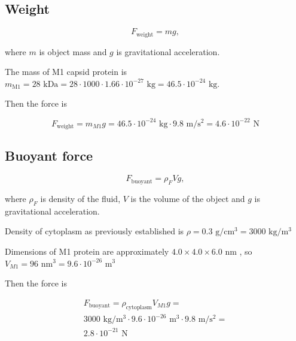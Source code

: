 \subsection{Weight}

\begin{equation}
F_{\text{weight}} = mg,
\end{equation}

where $m$ is object mass and $g$ is gravitational acceleration.

The mass of M1 capsid protein is $m_{\text{M1}} = 28 \text{ kDa} = 28 \cdot 1000 \cdot 1.66 \cdot 10^{-27} \text{ kg} = 46.5 \cdot 10^{-24} \text{ kg}$. \cite{shtykova2013structural}

Then the force is

\begin{equation}
F_{\text{weight}} = m_{M1}g = 46.5 \cdot 10^{-24} \text{ kg} \cdot 9.8 \text{ m}/\text{s}^2 = 4.6 \cdot 10^{-22} \text{ N}
\end{equation}

\subsection{Buoyant force}

\begin{equation}
F_{\text{buoyant}} = \rho_FVg,
\end{equation}

where $\rho_F$ is density of the fluid, $V$ is the volume of the object and $g$ is gravitational acceleration.

Density of cytoplasm as previously established is $\rho = 0.3 \text{ g}/\text{cm}^3 = 3000 \text{ kg}/\text{m}^3$ \cite{hartmann1967cytoplasmic}

Dimensions of M1 protein are approximately $4.0 \times 4.0 \times 6.0 \text{ nm}$ \cite{shtykova2013structural}, so $V_{M1} = 96 \text{ nm}^3 = 9.6 \cdot 10^{-26} \text{ m}^3$

Then the force is

\begin{equation}
\begin{split}
F_{\text{buoyant}} = \rho_{\text{cytoplasm}}V_{M1}g =\\
3000 \text{ kg}/\text{m}^3 \cdot 9.6 \cdot 10^{-26} \text{ m}^3 \cdot 9.8 \text{ m}/\text{s}^2 =\\
2.8 \cdot 10^{-21} \text{ N}
\end{split}
\end{equation}

